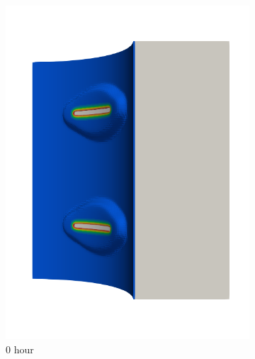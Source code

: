 \begin{figure}[!htb]
  \centering
  \begin{subfigure}[b]{0.2\textwidth}
    \centering
    \includegraphics[width=\textwidth]{Chapter5/figures/spallation/seed_d_4}
    \caption{0 hour}
  \end{subfigure}
  \begin{subfigure}[b]{0.2\textwidth}
    \centering

\end{subfigure}
\end{figure}
